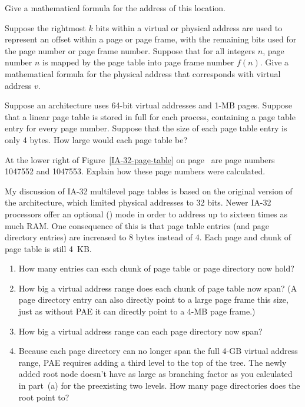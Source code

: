 \begin{chapterEnumerate}
Give a mathematical formula for the address of this location.
\item
Suppose the rightmost $k$ bits within a virtual or physical address
are used to represent an offset within a page or page frame, with the
remaining bits used for the page number or page frame number.  Suppose
that for all integers $n$, page number $n$ is mapped by the page table into page frame
number $f(n)$.  Give a mathematical formula for the physical address
that corresponds with virtual address $v$.
\item\label{linear-page-table-size-exercise}
Suppose an architecture uses 64-bit virtual addresses and 1-MB pages.
Suppose that a linear page table is stored in full for each process,
containing a page table entry for every page number.  Suppose that the size
of each page table entry is only 4 bytes.  How large would each
page table be?
\item\label{IA-32-page-table-exercise}
At the lower right of Figure~\ref{IA-32-page-table} on page~\pageref{IA-32-page-table} are page numbers
1047552 and 1047553.  Explain how these page numbers were calculated.
\item\label{PAE-exercise}
My discussion of IA-32 multilevel page tables is based on the
original version of the architecture, which limited physical addresses
to 32 bits.  Newer IA-32 processors offer an optional  () mode in order to address up to sixteen times as
much RAM.  One consequence of this is that page table entries (and
page directory entries) are increased to 8 bytes instead of 4.
Each page and chunk of page table is still 4~KB.
\begin{enumerate}
\item
How many entries can each chunk of page table or page directory now hold?
\item
How big a virtual address range does each chunk of page table now
span?  (A page directory entry can also directly point to a large
page frame this size, just as without PAE it can directly point to a
4-MB page frame.)
\item
How big a virtual address range can each page directory now span?
\item
Because each page directory can no longer span the full 4-GB
virtual address range, PAE requires adding a third level to the top of
the tree.  The newly added root node doesn't have as large as
branching factor as you calculated in part~(a)
for the preexisting two levels.  How many page directories does the
root point to?

\end{enumerate}
\end{chapterEnumerate}
